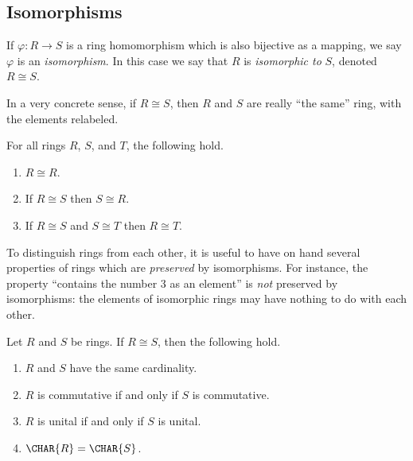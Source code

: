 \documentclass{article}
\begin{document}
\subsection*{Isomorphisms}

\begin{dfn}
If $\varphi : R \rightarrow S$ is a ring homomorphism which is also bijective as a mapping, we say $\varphi$ is an \emph{isomorphism}. In this case we say that $R$ is \emph{isomorphic to} $S$, denoted $R \cong S$.
\end{dfn}

In a very concrete sense, if $R \cong S$, then $R$ and $S$ are really ``the same'' ring, with the elements relabeled.

\begin{prop}
For all rings $R$, $S$, and $T$, the following hold.
\begin{enumerate}
\item $R \cong R$.
\item If $R \cong S$ then $S \cong R$.
\item If $R \cong S$ and $S \cong T$ then $R \cong T$.
\end{enumerate}
\end{prop}

\begin{center}
\end{center}

To distinguish rings from each other, it is useful to have on hand several properties of rings which are \emph{preserved} by isomorphisms. For instance, the property ``contains the number 3 as an element'' is \emph{not} preserved by isomorphisms: the elements of isomorphic rings may have nothing to do with each other.

\begin{prop}
Let $R$ and $S$ be rings. If $R \cong S$, then the following hold.
\begin{enumerate}
\item $R$ and $S$ have the same cardinality.
\item $R$ is commutative if and only if $S$ is commutative.
\item $R$ is unital if and only if $S$ is unital.
\item $\CHAR{R} = \CHAR{S}$.
\end{enumerate}
\end{prop}
\end{document}
